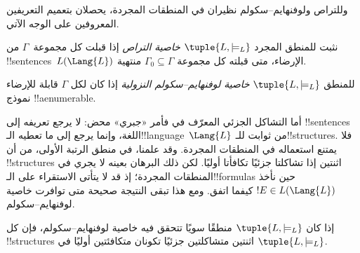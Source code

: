 \documentclass[../../../include/open-logic-section]{subfiles}
\begin{document}


وللتراص ولوفنهايم--سكولم نظيران في المنطقات المجردة، يحصلان بتعميم
التعريفين المعروفين على الوجه الآتي.

\begin{defn}
نثبت للمنطق المجرد $\tuple{L,\models_L}$ \emph{خاصية التراص} إذا قبلت كل
مجموعة~$\Gamma$ من !!{sentence}s~$L(\Lang{L})$ الإرضاء، متى قبلته
كل مجموعة $\Gamma_0 \subseteq \Gamma$ منتهية.
\end{defn}

\begin{defn}
للمنطق $\tuple{L,\models_L}$ \emph{خاصية لوفنهايم--سكولم النزولية} إذا
كان لكل $\Gamma$ قابلة للإرضاء نموذج !!a{enumerable}.
\end{defn}


أما التشاكل الجزئي المعرّف في  فأمر «جبري» محض:
لا يرجع تعريفه إلى !!{sentence}s اللغة، وإنما يرجع إلى ما تعطيه
الـ!!{language}~$\Lang{L}$ من ثوابت للـ!!{structure}s. فلا يمتنع استعماله
في المنطقات المجردة. وقد علمنا، في منطق الرتبة الأولى، من
 أن !!{structure}s اثنتين إذا تشاكلتا جزئيًا
تكافأتا أوليًا. لكن ذلك البرهان بعينه لا يجري في المنطقات المجردة؛ إذ قد لا يتأتى
الاستقراء على الـ!!{formula}s حين نأخذ $!E \in L(\Lang{L})$
كيفما اتفق. ومع هذا تبقى النتيجة صحيحة متى توافرت خاصية لوفنهايم--سكولم.

\begin{thm}
إذا كان $\tuple{L,\models_L}$ منطقًا سويًا تتحقق فيه خاصية لوفنهايم--سكولم،
فإن كل !!{structure}s اثنتين متشاكلتين جزئيًا تكونان متكافئتين أوليًا في
$\tuple{L,\models_L}$.
\end{thm}
\end{document}
